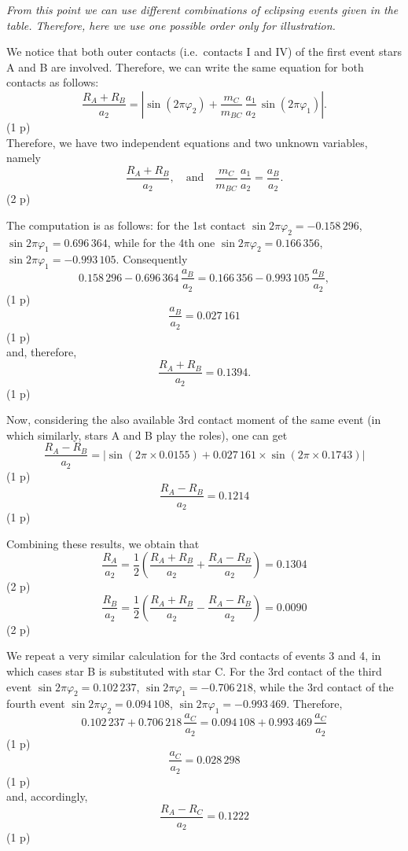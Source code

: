 \begin{description}
\begin{description}
    \emph{From this point we can use different combinations of eclipsing
    events given in the table. Therefore, here we use one possible order
    only for illustration.}

    We notice that both outer contacts (i.e.\ contacts I and IV) of the
    first event stars A and B are involved. Therefore, we can write the same
    equation for both contacts as follows:
    \[ \frac{R_A + R_B}{a_2} = \left| \sin(2\pi\varphi_2)
       + \frac{m_C}{m_{BC}}\,\frac{a_1}{a_2}\,\sin(2\pi\varphi_1) \right|.
       \tag*{(2.10)} \]
    \hfill(1 p)\\
    Therefore, we have two independent equations and two unknown variables,
    namely
    \[ \frac{R_A + R_B}{a_2}, \quad\text{and}\quad
       \frac{m_C}{m_{BC}}\,\frac{a_1}{a_2} = \frac{a_B}{a_2}.
       \tag*{(2.11)} \]
    \hfill(2 p)

    The computation is as follows: for the 1st contact
    $\sin 2\pi\varphi_2 = -0.158\,296$,
    $\sin 2\pi\varphi_1 = 0.696\,364$, while for the 4th one
    $\sin 2\pi\varphi_2 = 0.166\,356$,
    $\sin 2\pi\varphi_1 = -0.993\,105$. Consequently
    \[ 0.158\,296 - 0.696\,364\,\frac{a_B}{a_2}
       = 0.166\,356 - 0.993\,105\,\frac{a_B}{a_2},
       \tag*{(2.12)} \]
    \hfill(1 p)
    \[ \frac{a_B}{a_2} = 0.027\,161
       \tag*{(2.13)} \]
    \hfill(1 p)\\
    and, therefore,
    \[ \frac{R_A + R_B}{a_2} = 0.1394.
       \tag*{(2.14)} \]
    \hfill(1 p)

    Now, considering the also available 3rd contact moment of the same event
    (in which similarly, stars A and B play the roles), one can get
    \[ \frac{R_A - R_B}{a_2}
       = \left| \sin(2\pi \times 0.0155)
       + 0.027\,161 \times \sin(2\pi \times 0.1743) \right|
       \tag*{(2.15)} \]
    \hfill(1 p)
    \[ \frac{R_A - R_B}{a_2} = 0.1214
       \tag*{(2.16)} \]
    \hfill(1 p)

    Combining these results, we obtain that
    \[ \frac{R_A}{a_2} = \frac{1}{2}\left( \frac{R_A + R_B}{a_2}
       + \frac{R_A - R_B}{a_2} \right) = 0.1304
       \tag*{(2.17)} \]
    \hfill(2 p)
    \[ \frac{R_B}{a_2} = \frac{1}{2}\left( \frac{R_A + R_B}{a_2}
       - \frac{R_A - R_B}{a_2} \right) = 0.0090
       \tag*{(2.18)} \]
    \hfill(2 p)

    We repeat a very similar calculation for the 3rd contacts of events 3
    and 4, in which cases star B is substituted with star C. For the 3rd
    contact of the third event $\sin 2\pi\varphi_2 = 0.102\,237$,
    $\sin 2\pi\varphi_1 = -0.706\,218$, while the 3rd contact of the fourth
    event $\sin 2\pi\varphi_2 = 0.094\,108$,
    $\sin 2\pi\varphi_1 = -0.993\,469$. Therefore,
    \[ 0.102\,237 + 0.706\,218\,\frac{a_C}{a_2}
       = 0.094\,108 + 0.993\,469\,\frac{a_C}{a_2}
       \tag*{(2.19)} \]
    \hfill(1 p)
    \[ \frac{a_C}{a_2} = 0.028\,298
       \tag*{(2.20)} \]
    \hfill(1 p)\\
    and, accordingly,
    \[ \frac{R_A - R_C}{a_2} = 0.1222
       \tag*{(2.21)} \]
    \hfill(1 p)


\end{description}
\end{description}
